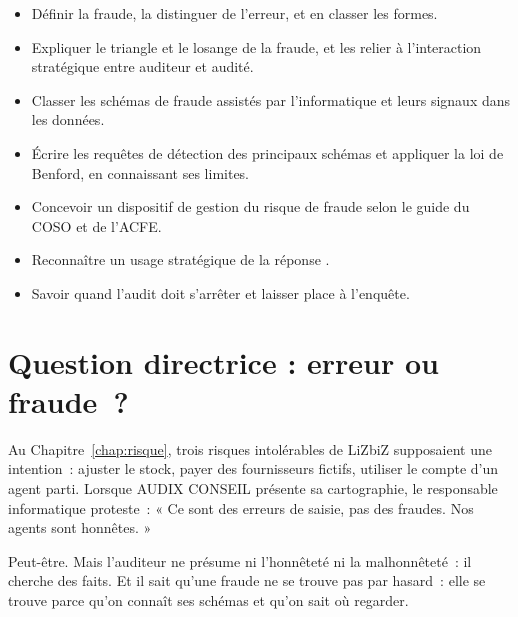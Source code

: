 \begin{boxobjectifs}
\begin{itemize}
    \item Définir la fraude, la distinguer de l'erreur, et en classer les
          formes.
    \item Expliquer le triangle et le losange de la fraude, et les relier à
          l'interaction stratégique entre auditeur et audité.
    \item Classer les schémas de fraude assistés par l'informatique et
          leurs signaux dans les données.
    \item Écrire les requêtes de détection des principaux schémas et
          appliquer la loi de Benford, en connaissant ses limites.
    \item Concevoir un dispositif de gestion du risque de fraude selon le
          guide du COSO et de l'ACFE.
    \item Reconnaître un usage stratégique de la réponse \NEK{}.
    \item Savoir quand l'audit doit s'arrêter et laisser place à
          l'enquête.
\end{itemize}
\end{boxobjectifs}

\bigskip

\section*{Question directrice : erreur ou fraude~?}

Au Chapitre~\ref{chap:risque}, trois risques intolérables de LiZbiZ
supposaient une intention~: ajuster le stock, payer des fournisseurs
fictifs, utiliser le compte d'un agent parti. Lorsque AUDIX CONSEIL
présente sa cartographie, le responsable informatique proteste~: « Ce sont
des erreurs de saisie, pas des fraudes. Nos agents sont honnêtes. »

Peut-être. Mais l'auditeur ne présume ni l'honnêteté ni la malhonnêteté~: il
cherche des faits. Et il sait qu'une fraude ne se trouve pas par hasard~:
elle se trouve parce qu'on connaît ses schémas et qu'on sait où regarder.

